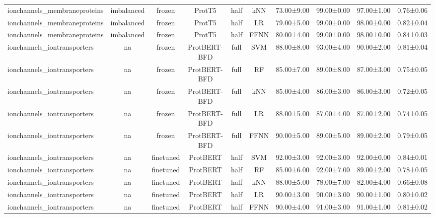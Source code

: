 \begin{tabular}{lcccccc}
    ionchannels\_membraneproteins & imbalanced &         frozen &       ProtT5 &      half &        kNN &  73.00±9.00 &  99.00±0.00 &  97.00±1.00 & 0.76±0.06 \\
    ionchannels\_membraneproteins & imbalanced &         frozen &       ProtT5 &      half &         LR &  79.00±5.00 &  99.00±0.00 &  98.00±0.00 & 0.82±0.04 \\
    ionchannels\_membraneproteins & imbalanced &         frozen &       ProtT5 &      half &       FFNN &  80.00±4.00 &  99.00±0.00 &  98.00±0.00 & 0.84±0.03 \\
     ionchannels\_iontransporters &         na &         frozen & ProtBERT-BFD &      full &        SVM &  88.00±8.00 &  93.00±4.00 &  90.00±2.00 & 0.81±0.04 \\
     ionchannels\_iontransporters &         na &         frozen & ProtBERT-BFD &      full &         RF &  85.00±7.00 &  89.00±8.00 &  87.00±3.00 & 0.75±0.05 \\
     ionchannels\_iontransporters &         na &         frozen & ProtBERT-BFD &      full &        kNN &  85.00±4.00 &  86.00±3.00 &  86.00±3.00 & 0.72±0.05 \\
     ionchannels\_iontransporters &         na &         frozen & ProtBERT-BFD &      full &         LR &  88.00±5.00 &  87.00±4.00 &  87.00±2.00 & 0.74±0.05 \\
     ionchannels\_iontransporters &         na &         frozen & ProtBERT-BFD &      full &       FFNN &  90.00±5.00 &  89.00±5.00 &  89.00±2.00 & 0.79±0.05 \\
     ionchannels\_iontransporters &         na &      finetuned &     ProtBERT &      half &        SVM &  92.00±3.00 &  92.00±3.00 &  92.00±0.00 & 0.84±0.01 \\
     ionchannels\_iontransporters &         na &      finetuned &     ProtBERT &      half &         RF &  85.00±6.00 &  92.00±7.00 &  89.00±2.00 & 0.78±0.05 \\
     ionchannels\_iontransporters &         na &      finetuned &     ProtBERT &      half &        kNN &  88.00±5.00 &  78.00±7.00 &  82.00±4.00 & 0.66±0.08 \\
     ionchannels\_iontransporters &         na &      finetuned &     ProtBERT &      half &         LR &  90.00±3.00 &  90.00±3.00 &  90.00±1.00 & 0.80±0.02 \\
     ionchannels\_iontransporters &         na &      finetuned &     ProtBERT &      half &       FFNN &  90.00±4.00 &  91.00±3.00 &  91.00±1.00 & 0.81±0.02 \\

\end{tabular}

